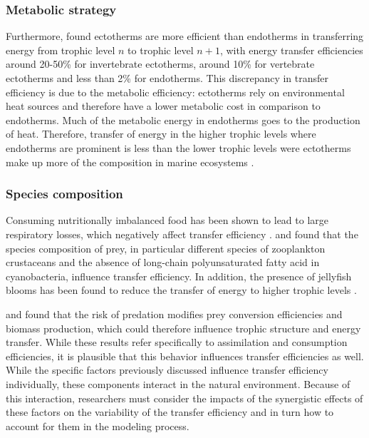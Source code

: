 \documentclass[oneside,12pt,final]{sty/ucthesis-CA2012}
\let\cite\citep                             %
\begin{document}
\begin{mainmatter}
\subsubsection*{Metabolic strategy}
Furthermore, \citet{may1983ecology} found ectotherms are more efficient than endotherms in transferring energy from trophic level $n$ to trophic level $n+1$, with energy transfer efficiencies around 20-50\% for invertebrate ectotherms, around 10\% for vertebrate ectotherms and less than 2\% for endotherms. This discrepancy in transfer efficiency is due to the metabolic efficiency: ectotherms rely on environmental heat sources and therefore have a lower metabolic cost in comparison to endotherms. Much of the metabolic energy in endotherms goes to the production of heat. Therefore, transfer of energy in the higher trophic levels where endotherms are prominent is less than the lower trophic levels were ectotherms make up more of the composition in marine ecosystems \cite{mcgarvey2018two}.

\subsubsection*{Species composition}
Consuming nutritionally imbalanced food has been shown to lead to large respiratory losses, which negatively affect transfer efficiency \cite{persson2007food}. \citet{karlsson2007differences} and \citet{vonelert2003absence} found that the species composition of prey, in particular different species of zooplankton crustaceans and the absence of long-chain polyunsaturated fatty acid in cyanobacteria, influence transfer efficiency. In addition, the presence of jellyfish blooms has been found to reduce the transfer of energy to higher trophic levels \cite{condon2011jellyfish}.

\vspace{5mm}

\citet{trussell2006fear} and \citet{schmitz2008individuals} found that the risk of predation modifies prey conversion efficiencies and biomass production, which could therefore influence trophic structure and energy transfer. While these results refer specifically to assimilation and consumption efficiencies, it is plausible that this behavior influences transfer efficiencies as well. While the specific factors  previously discussed influence transfer efficiency individually, these components interact in the natural environment. Because of this interaction, researchers must consider the impacts of the synergistic effects of these factors on the variability of the transfer efficiency and in turn how to account for them in the modeling process.  


\end{mainmatter}
\end{document}
